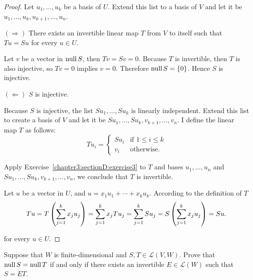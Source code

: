\begin{proof}
    Let $u_{1}, \ldots, u_{k}$ be a basis of $U$. Extend this list to a basis of $V$ and let it be $u_{1}, \ldots, u_{k}, u_{k+1}, \ldots, u_{n}$.

    $(\Rightarrow)$ There exists an invertible linear map $T$ from $V$ to itself such that $Tu = Su$ for every $u\in U$.

    Let $v$ be a vector in $\text{null}\,{S}$, then $Tv = Sv = 0$. Because $T$ is invertible, then $T$ is also injective, so $Tv = 0$ implies $v = 0$. Therefore $\text{null}\,{S} = \{0\}$. Hence $S$ is injective.

    $(\Leftarrow)$ $S$ is injective.

    Because $S$ is injective, the list $Su_{1}, \ldots, Su_{k}$ is linearly independent. Extend this list to create a basis of $V$ and let it be $Su_{1}, \ldots, Su_{k}, v_{k+1}, \ldots, v_{n}$. I define the linear map $T$ as follows:
    \[
        Tu_{i} = \begin{cases}
            Su_{i} & \text{if $1\leq i\leq k$} \\
            v_{i}  & \text{otherwise}.
        \end{cases}
    \]

    Apply Exercise~\ref{chapter3:sectionD:exercise3} to $T$ and bases $u_{1}, \ldots, u_{n}$ and $Su_{1}, \ldots, Su_{k}, v_{k+1}, \ldots, v_{n}$, we conclude that $T$ is invertible.

    Let $u$ be a vector in $U$, and $u = x_{1}u_{1} + \cdots + x_{k}u_{k}$. According to the definition of $T$
    \[
        Tu = T\left(\sum^{k}_{j=1}x_{j}u_{j}\right) = \sum^{k}_{j=1}x_{j}Tu_{j} = \sum^{k}_{j=1}Su_{j} = S\left(\sum^{k}_{j=1}x_{j}u_{j}\right) = Su.\qedhere
    \]

    for every $u\in U$.
\end{proof}
\newpage

\begin{exercise}
    Suppose that $W$ is finite-dimensional and $S, T \in \mathcal{L}(V, W)$. Prove that $\text{null}\,{S} = \text{null}\,{T}$ if and only if there exists an invertible $E \in \mathcal{L}(W)$ such that $S = ET$.
\end{exercise}

